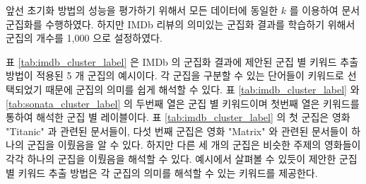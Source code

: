 \documentclass[oneside, ko,phd]{snuthesis_utf8_kor}
\begin{document}
앞선 초기화 방법의 성능을 평가하기 위해서 모든 데이터에 동일한 $k$ 를 이용하여 문서 군집화를 수행하였다.
하지만 IMDb 리뷰의 의미있는 군집화 결과를 학습하기 위해서 군집의 개수를 1,000 으로 설정하였다.

표 \ref{tab:imdb_cluster_label} 은 IMDb 의 군집화 결과에 제안된 군집 별 키워드 추출 방법이 적용된 5 개 군집의 예시이다.
각 군집을 구분할 수 있는 단어들이 키워드로 선택되었기 때문에 군집의 의미를 쉽게 해석할 수 있다.
표 \ref{tab:imdb_cluster_label} 와 \ref{tab:sonata_cluster_label} 의 두번째 열은 군집 별 키워드이며 첫번째 열은 키워드를 통하여 해석한 군집 별 레이블이다.
표 \ref{tab:imdb_cluster_label} 의 첫 군집은 영화 "Titanic" 과 관련된 문서들이, 다섯 번째 군집은 영화 "Matrix" 와 관련된 문서들이 하나의 군집을 이뤘음을 알 수 있다.
하지만 다른 세 개의 군집은 비슷한 주제의 영화들이 각각 하나의 군집을 이뤘음을 해석할 수 있다.
예시에서 살펴볼 수 있듯이 제안한 군집 별 키워드 추출 방법은 각 군집의 의미를 해석할 수 있는 키워드를 제공한다.
\end{document}
